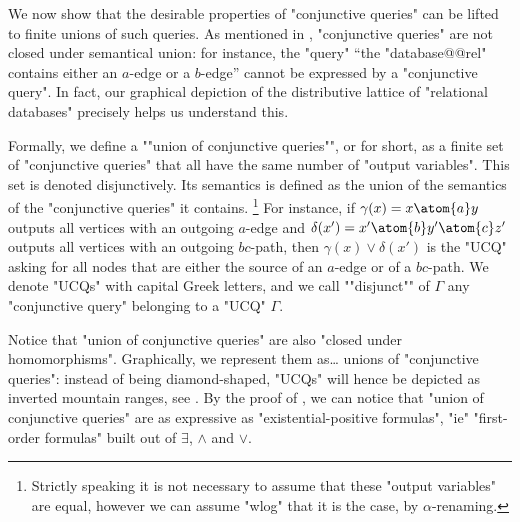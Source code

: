 We now show that the desirable properties of "conjunctive queries" can be
lifted to finite unions of such queries.
As mentioned in , "conjunctive queries"
are not closed under semantical union: for instance,
the "query" ``the "database@@rel" contains either an $a$-edge or a $b$-edge''
cannot be expressed by a "conjunctive query".
In fact, our graphical depiction of the distributive lattice of "relational databases"
precisely helps us understand this.

Formally, we define a ""union of conjunctive queries"", or  for short,
as a finite set of "conjunctive queries" that all have the same number
of "output variables". This set is denoted disjunctively.
Its semantics is defined as the union of the semantics of the "conjunctive queries" it contains.%
\footnote[][2em]{Strictly speaking it is not necessary
to assume that these "output variables" are equal, however we can assume "wlog" that
it is the case, by $\alpha$-renaming.}
For instance, if $\gamma(x) = x \atom{a} y$ outputs all vertices
with an outgoing $a$-edge and $\delta(x') = x' \atom{b} y' \atom{c} z'$
outputs all vertices with an outgoing $bc$-path, then
$\gamma(x) \lor \delta(x')$ is the "UCQ" asking for all nodes
that are either the source of an $a$-edge or of a $bc$-path.
We denote "UCQs" with capital Greek letters,
and \AP we call ""disjunct"" of $\Gamma$ any "conjunctive query" belonging to a
"UCQ" $\Gamma$.

Notice that "union of conjunctive queries" are also "closed under homomorphisms".
Graphically, we represent them as… unions of "conjunctive queries":
instead of being diamond-shaped, "UCQs" will hence be depicted
as inverted mountain ranges, see .
By the proof of , we can notice that "union of conjunctive queries"
are as expressive as "existential-positive formulas", "ie" "first-order formulas"
built out of $\exists$, $\land$ and $\lor$.

